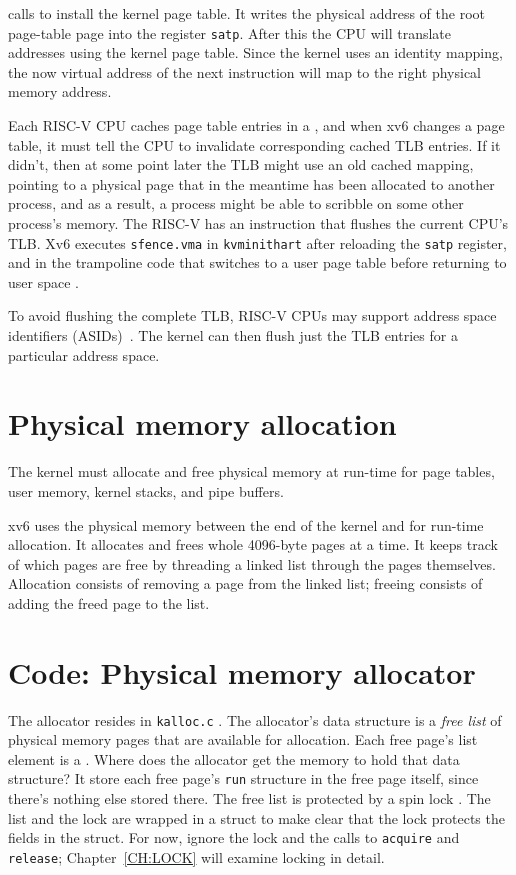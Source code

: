 calls
to install the kernel page table.
It writes the physical address of the root page-table page
into the register
\texttt{satp}.
After this the CPU will translate addresses using the kernel
page table.  Since the kernel uses an identity mapping, the now
virtual address of the next instruction will map to the right physical
memory address.

Each RISC-V CPU caches page table entries in a
, and when xv6 changes
a page table, it must tell the CPU to invalidate corresponding
cached TLB entries.  If it didn't,
then at some point later the TLB might
use an old cached mapping, pointing to a physical page that in the meantime
has been allocated to another process, and as a result, a process
might be able to scribble on some other process's memory.  The RISC-V
has an instruction  that flushes
the current CPU's TLB.
Xv6 executes {\tt sfence.vma} in {\tt kvminithart}  after reloading the 
\texttt{satp} register, and in the trampoline code that
switches to a user page table before returning to user space
.

To avoid flushing the complete TLB, RISC-V CPUs may support address
space identifiers (ASIDs)~\cite{riscv:priv}.  The kernel can then
flush just the TLB entries for a particular address space.

\section{Physical memory allocation}

The kernel must allocate and free physical memory at run-time for
page tables,
user memory,
kernel stacks,
and pipe buffers.

xv6 uses the physical memory between the end of the kernel and
for run-time allocation. It allocates and frees whole 4096-byte pages
at a time. It keeps track of which pages are free by threading a
linked list through the pages themselves. Allocation consists of
removing a page from the linked list; freeing consists of adding the
freed page to the list.
\section{Code: Physical memory allocator}

The allocator resides in {\tt kalloc.c} .
The allocator's data structure is a
\textit{free list}
of physical memory pages that are available
for allocation.
Each free page's list element is a
.
Where does the allocator get the memory
to hold that data structure?
It store each free page's
\lstinline{run}
structure in the free page itself,
since there's nothing else stored there.
The free list is
protected by a spin lock
.
The list and the lock are wrapped in a struct
to make clear that the lock protects the fields
in the struct.
For now, ignore the lock and the calls to
\lstinline{acquire}
and
\lstinline{release};
Chapter~\ref{CH:LOCK} will examine
locking in detail.

